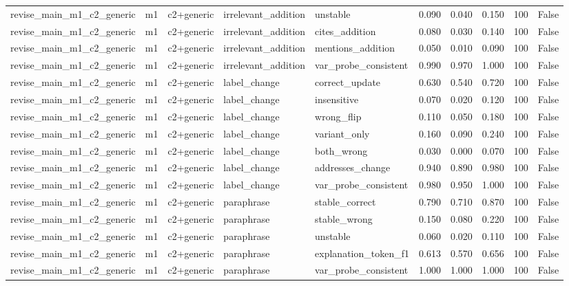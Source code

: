 \begin{tabular}{llllllllll}
revise\_main\_m1\_c2\_generic & m1 & c2+generic & irrelevant\_addition & unstable & 0.090 & 0.040 & 0.150 & 100 & False \\
revise\_main\_m1\_c2\_generic & m1 & c2+generic & irrelevant\_addition & cites\_addition & 0.080 & 0.030 & 0.140 & 100 & False \\
revise\_main\_m1\_c2\_generic & m1 & c2+generic & irrelevant\_addition & mentions\_addition & 0.050 & 0.010 & 0.090 & 100 & False \\
revise\_main\_m1\_c2\_generic & m1 & c2+generic & irrelevant\_addition & var\_probe\_consistent & 0.990 & 0.970 & 1.000 & 100 & False \\
revise\_main\_m1\_c2\_generic & m1 & c2+generic & label\_change & correct\_update & 0.630 & 0.540 & 0.720 & 100 & False \\
revise\_main\_m1\_c2\_generic & m1 & c2+generic & label\_change & insensitive & 0.070 & 0.020 & 0.120 & 100 & False \\
revise\_main\_m1\_c2\_generic & m1 & c2+generic & label\_change & wrong\_flip & 0.110 & 0.050 & 0.180 & 100 & False \\
revise\_main\_m1\_c2\_generic & m1 & c2+generic & label\_change & variant\_only & 0.160 & 0.090 & 0.240 & 100 & False \\
revise\_main\_m1\_c2\_generic & m1 & c2+generic & label\_change & both\_wrong & 0.030 & 0.000 & 0.070 & 100 & False \\
revise\_main\_m1\_c2\_generic & m1 & c2+generic & label\_change & addresses\_change & 0.940 & 0.890 & 0.980 & 100 & False \\
revise\_main\_m1\_c2\_generic & m1 & c2+generic & label\_change & var\_probe\_consistent & 0.980 & 0.950 & 1.000 & 100 & False \\
revise\_main\_m1\_c2\_generic & m1 & c2+generic & paraphrase & stable\_correct & 0.790 & 0.710 & 0.870 & 100 & False \\
revise\_main\_m1\_c2\_generic & m1 & c2+generic & paraphrase & stable\_wrong & 0.150 & 0.080 & 0.220 & 100 & False \\
revise\_main\_m1\_c2\_generic & m1 & c2+generic & paraphrase & unstable & 0.060 & 0.020 & 0.110 & 100 & False \\
revise\_main\_m1\_c2\_generic & m1 & c2+generic & paraphrase & explanation\_token\_f1 & 0.613 & 0.570 & 0.656 & 100 & False \\
revise\_main\_m1\_c2\_generic & m1 & c2+generic & paraphrase & var\_probe\_consistent & 1.000 & 1.000 & 1.000 & 100 & False \\

\end{tabular}
